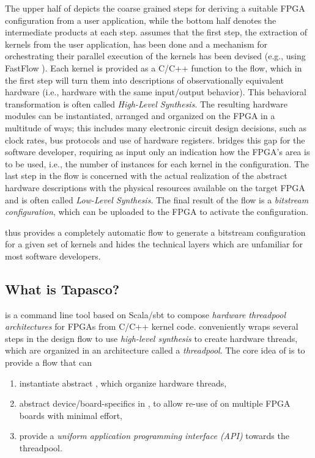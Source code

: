 \medskip
The upper half of  depicts the coarse grained steps for deriving a suitable FPGA configuration from a user application, while the bottom half denotes the intermediate products at each step.
\tapasco{} assumes that the first step, the extraction of kernels from the user application, has been done and a mechanism for orchestrating their parallel execution of the kernels has been devised (e.g., using FastFlow \cite{fastflow}).
Each kernel is provided as a C/C++ function to the \tapasco{} flow, which in the first step will turn them into descriptions of observationally equivalent hardware (i.e., hardware with the same input/output behavior).
This behavioral transformation is often called \emph{High-Level Synthesis}.
The resulting hardware modules can be instantiated, arranged and organized on the FPGA in a multitude of ways; this includes many electronic circuit design decisions, such as clock rates, bus protocols and use of hardware registers.
\tapasco{} bridges this gap for the software developer, requiring as input only an indication how the FPGA's area is to be used, i.e., the number of instances for each kernel in the configuration.
The last step in the flow is concerned with the actual realization of the abstract hardware descriptions with the physical resources available on the target FPGA and is often called \emph{Low-Level Synthesis}.
The final result of the \tapasco{} flow is a \emph{bitstream configuration}, which can be uploaded to the FPGA to activate the configuration.

\medskip
\tapasco{} thus provides a completely automatic flow to generate a bitstream configuration for a given set of kernels and hides the technical layers which are unfamiliar for most software developers.

\subsection*{What is Tapasco?}
\tapasco{} is a command line tool based on Scala/sbt to compose \emph{hardware threadpool architectures} for FPGAs from C/C++ kernel code.
\tapasco{} conveniently wraps several steps in the design flow to use \emph{high-level synthesis} to create hardware threads, which are organized in an architecture called a \emph{threadpool}.
The core idea of \tapasco{} is to provide a flow that can
\begin{enumerate}
  \item instantiate abstract , which organize hardware threads,
  \item abstract device/board-specifics in , to allow re-use of  on multiple FPGA boards with minimal effort,
  \item provide a \emph{uniform application programming interface (API)} towards the threadpool.
\end{enumerate}

